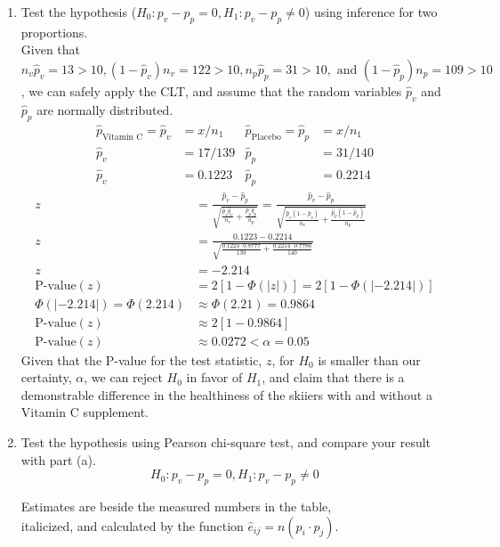 \documentclass{article}
\begin{document}
\begin{enumerate}[\quad(a)]
	\item Test the hypothesis ($ H_0: p_v - p_p = 0, H_1: p_v - p_p \neq 0 $) using inference for two proportions.\\


	Given that $n_v\hat{p}_v = 13 > 10, (1-\hat{p}_v)n_v = 122 > 10, n_p \hat{p}_p = 31 > 10, \text{ and } (1-\hat{p}_p)n_p = 109 > 10$, we can safely apply the CLT, and assume that the random variables $\hat{p}_v$ and $\hat{p}_p$ are normally distributed.
	\begin{align*}
		\hat{p}_{\text{Vitamin C}} = \hat{p}_v &= x/n_1 & \hat{p}_{\text{Placebo}} = \hat{p}_p &= x/n_1 \\
		\hat{p}_v &= 17/139 & \hat{p}_p &= 31/140\\	
		\hat{p}_v &= 0.1223 & \hat{p}_p &= 0.2214
	\end{align*}
	\begin{align*}
		z &= \frac{\hat{p}_v - \hat{p}_p}{\sqrt{\frac{\hat{p}_v\hat{q}_v}{n_v}+\frac{\hat{p}_p\hat{q}_p}{n_p}}} = \frac{\hat{p}_v - \hat{p}_p}{\sqrt{\frac{\hat{p}_v(1 - \hat{p}_v)}{n_v}+\frac{\hat{p}_p(1 - \hat{p}_p)}{n_p}}}\\
		z &= \frac{0.1223 - 0.2214}{\sqrt{\frac{0.1223 \cdot 0.8777}{139} + \frac{0.2214 \cdot 0.7786}{140}}}\\
		z &= -2.214\\
		\text{P-value}(z) &= 2[1-\Phi(|z|)] = 2[1 - \Phi(|-2.214|)]\\
		\Phi(|-2.214|) = \Phi(2.214) &\approx \Phi(2.21) = 0.9864\\
		\text{P-value}(z) &\approx 2[1 - 0.9864]\\
		\text{P-value}(z) &\approx 0.0272 < \alpha = 0.05
	\end{align*}
	Given that the P-value for the test statistic, $z$, for $H_0$ is smaller than our certainty, $\alpha$, we can reject $H_0$ in favor of $H_1$, and claim that there is a demonstrable difference in the healthiness of the skiiers with and without a Vitamin C supplement.
	\item Test the hypothesis using Pearson chi-square test, and compare your result with part (a).
	$$ H_0: p_v - p_p = 0, H_1: p_v - p_p \neq 0 $$
	\begin{center}
	Estimates are beside the measured numbers in the table, \\italicized, and calculated by the function $\hat{e}_{ij} = n(p_i \cdot p_j)$.


\end{center}
\end{enumerate}
\end{document}
